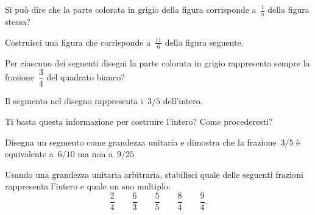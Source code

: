 \begin{esercizio}
 \label{ese:3.11}
Si può dire che la parte colorata in grigio della figura corrisponde 
a~\(\frac{1}{5}\) della figura stessa?
\end{esercizio}

\begin{esercizio}
 \label{ese:3.12}
Costruisci una figura che corrisponde a~\(\frac{11}{6}\) della figura seguente.
\end{esercizio}

\begin{esercizio}
 \label{ese:3.13}
Per ciascuno dei seguenti disegni la parte colorata in grigio rappresenta 
sempre la frazione~\(\dfrac{3}{4}\) del quadrato bianco?
 \begin{center}
 
 \end{center}
\end{esercizio}

\begin{esercizio}
 \label{ese:3.14}
Il segmento nel disegno rappresenta i~\(3/5\) dell'intero.
 \begin{center}
 
 \end{center}
Ti basta questa informazione per costruire l'intero? Come procederesti?
\end{esercizio}

\begin{esercizio}
 \label{ese:3.15}
Disegna un segmento come grandezza unitaria e dimostra che la frazione~\(3/5\) 
è equivalente a~\(6/10\) ma non a~\(9/25\)
% 
\end{esercizio}

\begin{esercizio}
 \label{ese:3.16}
Usando una grandezza unitaria arbitraria, stabilisci quale delle seguenti 
frazioni rappresenta l'intero e quale un suo multiplo:
\[\dfrac{2}{4}\qquad\dfrac{6}{3}\qquad\dfrac{5}{5}\qquad\dfrac{8}{4}\qquad
\dfrac{9}{4}.\]
\end{esercizio}

